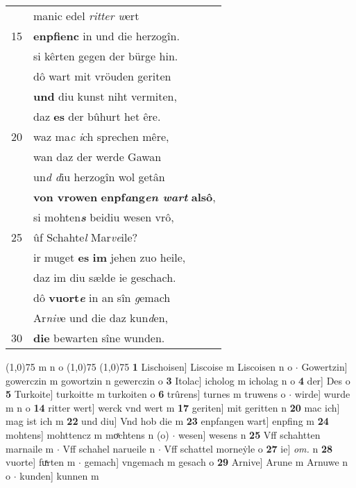 \documentclass[8pt,a4paper,notitlepage]{article}
\begin{document}
\begin{table}[ht]
\begin{minipage}[t]{0.5\linewidth}
\begin{tabular}{rl}
 & manic edel \textit{ritter w}ert\\ 
15 & \textbf{enpfienc} in und die herzogîn.\\ 
 & si kêrten gegen der bürge hin.\\ 
 & dô wart mit vröuden geriten\\ 
 & \textbf{und} diu kunst niht vermiten,\\ 
 & daz \textbf{es} der bûhurt het êre.\\ 
20 & waz ma\textit{c i}ch sprechen mêre,\\ 
 & wan daz der werde Gawan\\ 
 & un\textit{d d}iu herzogîn wol getân\\ 
 & \textbf{von vrowen} \textbf{enpf\textit{a}ng\textit{en wart}} \textbf{alsô},\\ 
 & si mohten\textit{\textbf{s}} beidiu wesen vrô,\\ 
25 & ûf Schahte\textit{l} Mar\textit{ve}ile?\\ 
 & ir muget \textbf{es} \textbf{im} jehen zuo heile,\\ 
 & daz im diu sælde ie geschach.\\ 
 & dô \textbf{vuort\textit{e}} in an sîn \textit{g}emach\\ 
 & Ar\textit{niv}e und die daz kun\textit{d}en,\\ 
30 & \textbf{die} bewarten sîne wunden.\\ 
\end{tabular}
\scriptsize
\line(1,0){75} \newline
m n o \newline
\line(1,0){75} \newline
\newline
\line(1,0){75} \newline
\textbf{1} Lischoisen] Liscoise m Liscoisen n o  $\cdot$ Gowertzin] gowerczin m gowortzin n gewerczin o \textbf{3} Itolac] icholog m icholag n o \textbf{4} der] Des o \textbf{5} Turkoite] turkoitte m turkoiten o \textbf{6} trûrens] turnes m truwens o  $\cdot$ wirde] wurde m n o \textbf{14} ritter wert] werck vnd wert m \textbf{17} geriten] mit geritten n \textbf{20} mac ich] mag ist ich m \textbf{22} und diu] Vnd hob die m \textbf{23} enpfangen wart] enpfing m \textbf{24} mohtens] mohttencz m moͯchtens n (o)  $\cdot$ wesen] wesens n \textbf{25} Vff schahtten marnaile m  $\cdot$ Vff schahel narueile n  $\cdot$ Vff schattel morneẏle o \textbf{27} ie] \textit{om.} n \textbf{28} vuorte] fuͯrten m  $\cdot$ gemach] vngemach m gesach o \textbf{29} Arnive] Arune m Arnuwe n o  $\cdot$ kunden] kunnen m \newline
\end{minipage}
\end{table}
\end{document}
